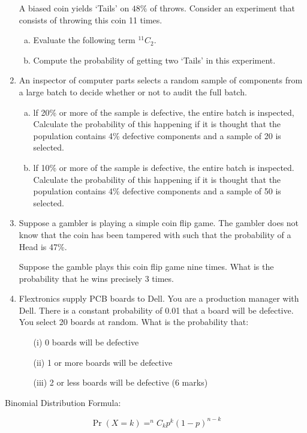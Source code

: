 \documentclass[a4paper,12pt]{article}
\begin{document}
\begin{enumerate}
A biased coin yields `Tails' on $48\%$ of throws. Consider an experiment that consists of throwing this coin 11 times.
\begin{enumerate}[(a)]
	\item Evaluate the following term $^{11}C_2$.
	\item Compute the probability of getting two `Tails' in this experiment.
\end{enumerate}

\newpage

\item 
An inspector of computer parts selects a random sample of components
from a large batch to decide whether or not to audit the full batch.

\begin{enumerate}[(a)]
	\item lf 20\% or more of the sample is defective, the entire batch is
	inspected, Calculate the probability of this happening if it is
	thought that the population contains 4\% defective components and
	a sample of 20 is selected.
	\item lf 10\% or more of the sample is defective, the entire batch is
	inspected. Calculate the probability of this happening if it is
	thought that the population contains 4\% defective components and
	a sample of 50 is selected.
	
\end{enumerate}

\item 
Suppose a gambler is playing a simple coin flip game. 
The gambler does not know that the coin has been tampered with such that the probability of a Head is 47\%.

Suppose the gamble plays this coin flip game nine times. 
What is the probability that he wins precisely 3 times.
\item	Flextronics supply PCB boards to Dell.  You are a production manager with Dell.  There is a constant probability of 0.01 that a board will be defective.  You select 20 boards at random.  What is the probability that:
\begin{itemize}
	\item[(i)]	0 boards will be defective
	\item[(ii)]	1 or more boards will be defective
	\item[(iii)]	2 or less boards will be defective			
	(6 marks)
\end{itemize}

	\end{enumerate}
\begin{framed}
\noindent Binomial Distribution Formula:

\[\Pr(X = k) = ^nC_k p^k
(1 − p)^{n−k}\]	
\end{framed}
	
\end{document}
